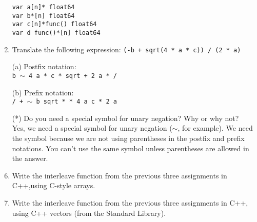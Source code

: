 \documentclass{article}
\begin{document}
\begin{enumerate}
\begin{verbatim}
var a[n]* float64
var b*[n] float64
var c[n]*func() float64
var d func()*[n] float64
\end{verbatim}
\pagebreak
\item Translate the following expression: \texttt{(-b + sqrt(4 * a * c)) / (2 * a)}
    \item[(a)]Postfix notation: \\\texttt{b \(\sim\) 4 a * c * sqrt + 2 a * /} \\
    \item[(b)]Prefix notation: \\\texttt{/ + \(\sim\) b sqrt * * 4 a c * 2 a} \\ 
    \item[(*)] Do you need a special symbol for unary negation? Why or why not? \\
    Yes, we need a special symbol for unary negation (\(\sim\), for example). We need the symbol because we are not using parentheses in the postfix and prefix notations. You can't use the same symbol unless parentheses are allowed in the answer.
\pagebreak
\item Write the interleave function from the previous three assignments in C++,using C-style arrays.

\pagebreak
\item Write the interleave function from the previous three assignments in C++, using C++ vectors (from the Standard Library).

\pagebreak
\end{enumerate}
\end{document}
